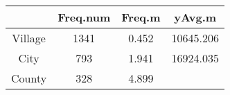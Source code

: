 \documentclass[]{book}
\theoremstyle{definition}
\theoremstyle{definition}
\theoremstyle{definition}
\theoremstyle{remark}
\begin{document}
\begin{longtable}[]{@{}cccc@{}}
\toprule
\begin{minipage}[b]{0.26\columnwidth}\centering\strut
~\strut
\end{minipage} & \begin{minipage}[b]{0.14\columnwidth}\centering\strut
Freq.num\strut
\end{minipage} & \begin{minipage}[b]{0.11\columnwidth}\centering\strut
Freq.m\strut
\end{minipage} & \begin{minipage}[b]{0.14\columnwidth}\centering\strut
yAvg.m\strut
\end{minipage}\tabularnewline
\midrule
\endhead
\begin{minipage}[t]{0.26\columnwidth}\centering\strut
Village\strut
\end{minipage} & \begin{minipage}[t]{0.14\columnwidth}\centering\strut
1341\strut
\end{minipage} & \begin{minipage}[t]{0.11\columnwidth}\centering\strut
0.452\strut
\end{minipage} & \begin{minipage}[t]{0.14\columnwidth}\centering\strut
10645.206\strut
\end{minipage}\tabularnewline
\begin{minipage}[t]{0.26\columnwidth}\centering\strut
City\strut
\end{minipage} & \begin{minipage}[t]{0.14\columnwidth}\centering\strut
793\strut
\end{minipage} & \begin{minipage}[t]{0.11\columnwidth}\centering\strut
1.941\strut
\end{minipage} & \begin{minipage}[t]{0.14\columnwidth}\centering\strut
16924.035\strut
\end{minipage}\tabularnewline
\begin{minipage}[t]{0.26\columnwidth}\centering\strut
County\strut
\end{minipage} & \begin{minipage}[t]{0.14\columnwidth}\centering\strut
328\strut
\end{minipage} & \begin{minipage}[t]{0.11\columnwidth}\centering\strut
4.899\strut
\end{minipage} & \begin{minipage}[t]{0.14\columnwidth}\centering\strut

\end{minipage}
\end{longtable}
\end{document}

